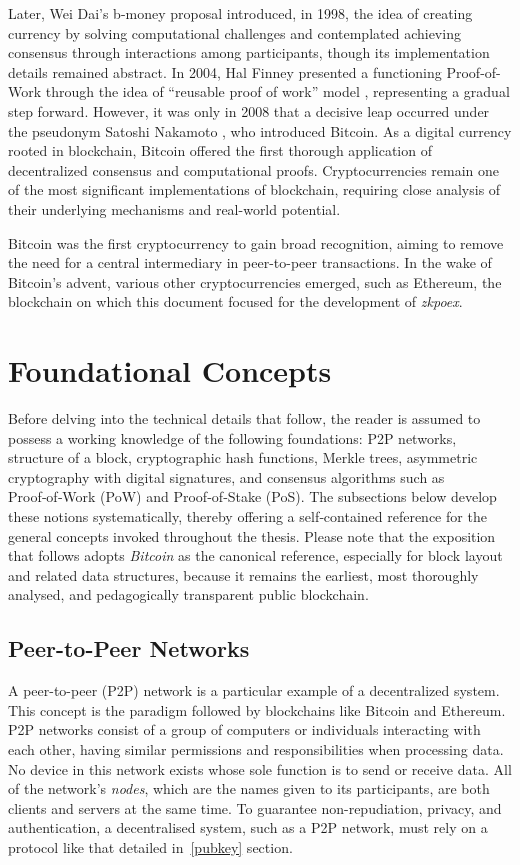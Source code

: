 Later, Wei Dai's b-money proposal \cite{DaiBmoney} introduced, in 1998, the idea of creating currency by solving computational challenges and contemplated achieving consensus through interactions among participants, though its implementation details remained abstract. In 2004, Hal Finney presented a functioning Proof-of-Work through the idea of “reusable proof of work” model \cite{Fin}, representing a gradual step forward. However, it was only in 2008 that a decisive leap occurred under the pseudonym Satoshi Nakamoto \cite{bitcoin}, who introduced Bitcoin. As a digital currency rooted in blockchain, Bitcoin offered the first thorough application of decentralized consensus and computational proofs. Cryptocurrencies remain one of the most significant implementations of blockchain, requiring close analysis of their underlying mechanisms and real-world potential.

Bitcoin was the first cryptocurrency to gain broad recognition, aiming to remove the need for a central intermediary in peer-to-peer transactions. In the wake of Bitcoin's advent, various other cryptocurrencies emerged, such as Ethereum, the blockchain on which this document focused for the development of \textit{zkpoex}.

\section{Foundational Concepts}
Before delving into the technical details that follow, the reader is assumed to possess a working knowledge of the following foundations: P2P networks, structure of a block, cryptographic hash functions, Merkle trees, asymmetric cryptography with digital signatures, and consensus algorithms such as Proof‑of‑Work (PoW) and Proof‑of‑Stake (PoS). The subsections below develop these notions systematically, thereby offering a self‑contained reference for the general concepts invoked throughout the thesis. Please note that the exposition that follows adopts \textit{Bitcoin} as the canonical reference, especially for block layout and related data structures, because it remains the earliest, most thoroughly analysed, and pedagogically transparent public blockchain.

\subsection{Peer-to-Peer Networks}\label{p2p_networks}

A peer-to-peer (P2P) network is a particular example of a decentralized system. This concept is the paradigm followed by blockchains like Bitcoin and Ethereum. P2P networks consist of a group of computers or individuals interacting with each other, having similar permissions and responsibilities when processing data. No device in this network exists whose sole function is to send or receive data.  All of the network's \textit{nodes}, which are the names given to its participants, are both clients and servers at the same time. To guarantee non-repudiation, privacy, and authentication, a decentralised system, such as a P2P network, must rely on a protocol like that detailed in~\ref{pubkey} section.

